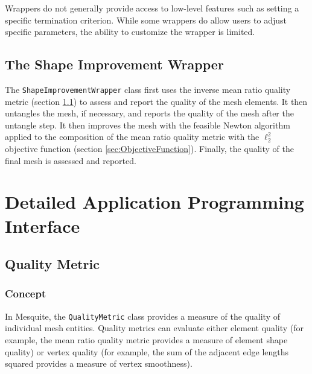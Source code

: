 Wrappers do not generally provide access to low-level features such
as setting a specific termination criterion.  While some wrappers do allow
users to adjust specific parameters, the ability to customize the wrapper
is limited.

\subsection{The Shape Improvement Wrapper}
\label{sec:ShapeImprovementWrapper}
The \texttt{ShapeImprovementWrapper} class 
first uses the inverse mean ratio quality
metric (section \ref{sec:QualityMetric}) to assess and report
the quality of the mesh elements. It then untangles the mesh, if
necessary, and reports the quality of the mesh after
the untangle step.  It then improves the mesh with the
feasible Newton algorithm applied to the composition of the mean ratio
quality metric with the $\ell_2^2$ objective function
(section \ref{sec:ObjectiveFunction}). Finally, the quality of the final
mesh is assessed and reported. 


\section{Detailed Application Programming Interface}
\label{sec:detailedAPI}

\subsection{Quality Metric} \label{sec:QualityMetric}


\subsubsection{Concept}

In Mesquite, the \texttt{QualityMetric} class provides a measure of
the quality of individual mesh entities.  Quality metrics can evaluate
either element quality (for example, the mean ratio quality
metric provides a measure of element shape quality) or vertex quality
(for example, the sum of the adjacent edge lengths squared provides a
measure of vertex smoothness).  

